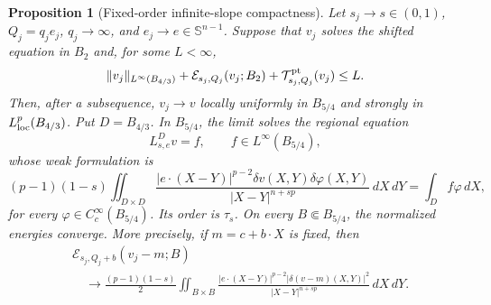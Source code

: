 \documentclass[11pt,reqno]{amsart}
\numberwithin{equation}{section}
\newcommand{\dd}{\,d}
\newtheorem{proposition}[theorem]{Proposition}
\theoremstyle{remark}
\begin{document}
\begin{proposition}[Fixed-order infinite-slope compactness]
\label{prop:fixed-order-infinite-slope-compactness}
Let \(s_j\to s\in(0,1)\), \(Q_j=q_je_j\),
\(q_j\to\infty\), and \(e_j\to e\in\mathbb S^{n-1}\).
Suppose that \(v_j\) solves the shifted equation in \(B_2\) and, for
some \(L<\infty\),
\[
 \|v_j\|_{L^\infty(B_{4/3})}
 +\mathcal E_{s_j,Q_j}(v_j;B_2)
 +\mathcal T^{\rm pt}_{s_j,Q_j}(v_j)\le L.
\]
Then, after a subsequence, \(v_j\to v\) locally uniformly in
\(B_{5/4}\) and strongly in \(L^p_{\rm loc}(B_{4/3})\).  Put
\(D=B_{4/3}\).  In \(B_{5/4}\),
the limit solves the regional equation
\begin{equation}
 L^D_{s,e}v=f,\qquad f\in L^\infty(B_{5/4}),
 \label{eq:large-slope-limit-equation}
\end{equation}
whose weak formulation is
\begin{equation}
 (p-1)(1-s)
 \iint_{D\times D}
 \frac{|e\cdot(X-Y)|^{p-2}\delta v(X,Y)\delta\varphi(X,Y)}
 {|X-Y|^{n+sp}}\dd X\!\dd Y
 =\int_Df\varphi\dd X,
 \label{eq:large-slope-limit-form}
\end{equation}
for every \(\varphi\in C_c^\infty(B_{5/4})\).
Its order is \(\tau_s\).  On every \(B\Subset B_{5/4}\), the normalized
energies converge.  More precisely, if \(m=c+b\cdot X\) is fixed, then
\begin{equation}
 \begin{split}
 &\mathcal E_{s_j,Q_j+b}(v_j-m;B)\\
 &\quad\longrightarrow
 \frac{(p-1)(1-s)}2
 \iint_{B\times B}
 \frac{|e\cdot(X-Y)|^{p-2}
       |\delta(v-m)(X,Y)|^2}
 {|X-Y|^{n+sp}}\dd X\!\dd Y.
 \end{split}
 \label{eq:infinite-slope-recentered-energy-convergence}
\end{equation}
\end{proposition}
\end{document}
